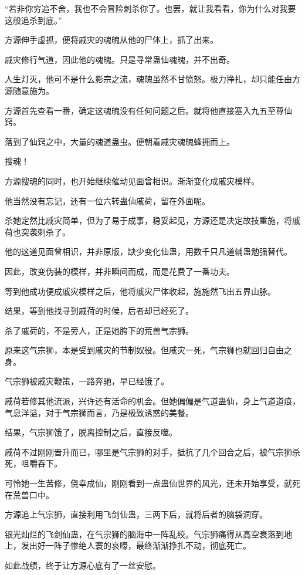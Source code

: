 \begin{this_body}
“若非你穷追不舍，我也不会冒险刺杀你了。也罢，就让我看看，你为什么对我要这般追杀到底。”

方源伸手虚抓，便将戚灾的魂魄从他的尸体上，抓了出来。

戚灾修行气道，因此他的魂魄。只是寻常蛊仙魂魄，并不出奇。

人生灯灭，他可不是什么影宗之流，魂魄虽然不甘愤怒。极力挣扎，却只能任由方源随意施为。

方源首先查看一番，确定这魂魄没有任何问题之后。就将他直接塞入九五至尊仙窍。

落到了仙窍之中，大量的魂道蛊虫。便朝着戚灾魂魄蜂拥而上。

搜魂！

方源搜魂的同时，也开始继续催动见面曾相识。渐渐变化成戚灾模样。

他当然没有忘记，还有一位六转蛊仙戚荷，留在外面呢。

杀她定然比戚灾简单，但为了易于成事，稳妥起见，方源还是决定故技重施，将戚荷也突袭刺杀了。

他的这道见面曾相识，并非原版，缺少变化仙蛊，用数千只凡道辅蛊勉强替代。

因此，改变伪装的模样，并非瞬间而成，而是花费了一番功夫。

等到他成功便成戚灾模样之后，他将戚灾尸体收起，施施然飞出五界山脉。

结果，等到他找寻到戚荷的时候，后者却已经死了。

杀了戚荷的，不是旁人，正是她胯下的荒兽气宗狮。

原来这气宗狮，本是受到戚灾的节制奴役。但戚灾一死，气宗狮也就回归自由之身。

气宗狮被戚灾鞭策，一路奔驰，早已经饿了。

戚荷若修其他流派，兴许还有活命的机会。但她偏偏是气道蛊仙，身上气道道痕，气息洋溢，对于气宗狮而言，乃是极致诱惑的美餐。

结果，气宗狮饿了，脱离控制之后，直接反噬。

戚荷不过刚刚晋升而已，哪里是气宗狮的对手，抵抗了几个回合之后，被气宗狮杀死，咀嚼吞下。

可怜她一生苦修，侥幸成仙，刚刚看到一点蛊仙世界的风光，还未开始享受，就死在荒兽口中。

方源追上气宗狮，直接利用飞剑仙蛊，三两下后，就将后者的脑袋洞穿。

银光灿烂的飞剑仙蛊，在气宗狮的脑海中一阵乱绞。气宗狮痛得从高空衰落到地上，发出好一阵子惨绝人寰的哀嚎，最终渐渐挣扎不动，彻底死亡。

如此战绩，终于让方源心底有了一丝安慰。


\end{this_body}
